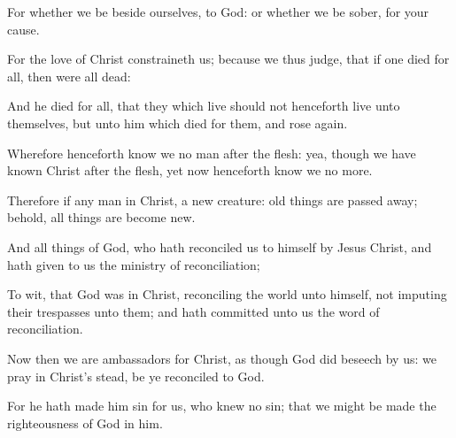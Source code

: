 {For
whether we be beside
ourselves,
{} to
God: or
whether we be
sober,
{} for your
cause.

For the
love of
Christ
constraineth
us;
because we thus
judge,
that
if
one
died
for
all,
then
were
all
dead:

And
{} he
died
for
all,
that
they which
live
should not
henceforth
live unto
themselves,
but unto
him which
died
for
them,
and rose
again.

Wherefore
henceforth
know
we no
man
after the
flesh:
yea,
though we have
known
Christ
after the
flesh,
yet now
henceforth know
we
{} no
more.

Therefore
if any
man
{}
in
Christ,
{} a
new
creature: old
things are passed
away;
behold, all
things are
become
new.

And all
things
{}
of
God,
who hath
reconciled
us to
himself
by
Jesus
Christ,
and hath
given to
us the
ministry of
reconciliation;

To
wit,
that
God
was
in Christ,
reconciling the
world unto
himself,
not
imputing
their
trespasses unto
them;
and hath
committed
unto
us the
word of
reconciliation.

Now
then we are
ambassadors
for
Christ, as
though
God did
beseech
{}
by
us: we
pray
{}
in
Christ’s stead, be ye
reconciled to
God.

For he hath made
him
{}
sin
for
us, who
knew
no
sin;
that
we might be
made the
righteousness of
God
in
him.




\par }
